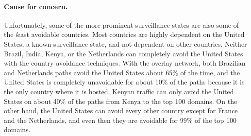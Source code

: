 \paragraph{Cause for concern.}
Unfortunately, some of the more prominent surveillance states are also
some of the {\textit least avoidable} countries.  Most countries are
highly dependent on the United States, a known surveillance state, and
not dependent on other countries.  Neither Brazil, India, Kenya, or the
Netherlands can completely avoid the United States with the country
avoidance techniques.  With the overlay network, both Brazilian and
Netherlands paths avoid the United States about 65\% of the time, and
the United States is completely unavoidable for about 10\% of the paths
because it is the only country where it is hosted.  Kenyan traffic can
only avoid the United States on about 40\% of the paths from Kenya to
the top 100 domains.  On the other hand, the United States can avoid
every other country except for France and the Netherlands, and even then
they are avoidable for 99\% of the top 100 domains.   


